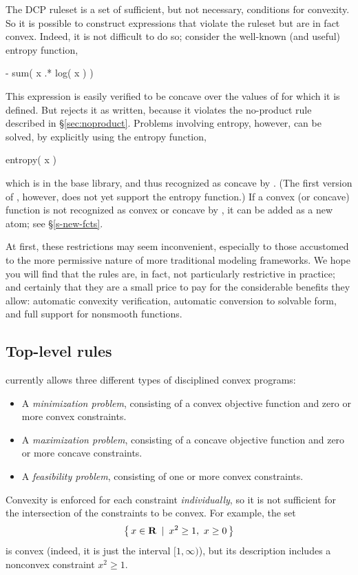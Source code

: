 \documentclass[12pt]{article}
\begin{document}
The DCP ruleset is a set of sufficient, but not necessary, conditions
for convexity. So it is possible to construct expressions that violate
the ruleset but are in fact convex. 
Indeed, it is not difficult to do so;
consider the well-known (and useful) entropy function,
\begin{code}
	- sum( x .* log( x ) )
\end{code}
This expression is easily verified to be concave over the values of \verb@x@ for which it is defined. But \cvx
rejects it as written, because it violates the 
no-product rule described in \S\ref{sec:noproduct}. 
Problems involving entropy, however, can be solved, by explicitly
using the entropy function, 
\begin{code}
	entropy( x )
\end{code}
which is in the base \cvx library, and thus recognized as 
concave by \cvx.
(The first version of \cvx, however, does not yet support the 
entropy function.)
If a convex (or concave) function is not recognized as
convex or concave by \cvx, it can be added as a new atom;
see \S\ref{s-new-fcts}.

At first, these restrictions may seem inconvenient,
especially to those accustomed to the more permissive nature of 
more traditional modeling frameworks.
We hope you will find that the rules are, in fact, not 
particularly restrictive
in practice; and certainly that they are a small price to pay 
for the considerable benefits they allow: automatic convexity 
verification, automatic
conversion to solvable form, and full support for nonsmooth functions. 

\subsection{Top-level rules}

\cvx currently allows three different types of disciplined convex programs:
\begin{itemize}
\item A \emph{minimization problem}, consisting of a convex objective function
and zero or more convex constraints.
\item A \emph{maximization problem}, consisting of a concave objective function
and zero or more concave constraints.
\item A \emph{feasibility problem}, consisting of one or more convex constraints.
\end{itemize}
Convexity is enforced for each constraint \emph{individually}, so it is not
sufficient for the intersection of the constraints to be convex. For example, the set
\begin{equation*}
	\Condset{ x\in \R }{ x^2 \geq 1, ~ x \geq 0 }
\end{equation*}
is convex (indeed, it is just the interval $[1,\infty)$), but its description
includes a nonconvex constraint $x^2 \geq 1$.
\end{document}
